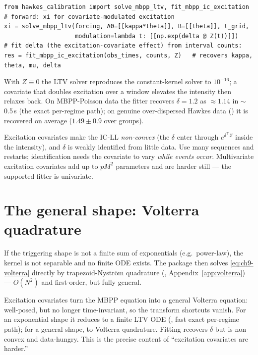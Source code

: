 \begin{lstlisting}[caption={Forward solve and fitting with excitation covariates.}]
from hawkes_calibration import solve_mbpp_ltv, fit_mbpp_ic_excitation
# forward: xi for covariate-modulated excitation
xi = solve_mbpp_ltv(forcing, A0=[[kappa*theta]], B=[[theta]], t_grid,
                    modulation=lambda t: [[np.exp(delta @ Z(t))]])
# fit delta (the excitation-covariate effect) from interval counts:
res = fit_mbpp_ic_excitation(obs_times, counts, Z)   # recovers kappa, theta, mu, delta
\end{lstlisting}

\begin{examplebox}
With $Z\equiv0$ the LTV solver reproduces the constant-kernel solver to $10^{-16}$;
a covariate that doubles excitation over a window elevates the intensity then
relaxes back. On MBPP-Poisson data the fitter recovers $\delta=1.2$ as $\approx1.14$
in $\sim$0.5\,s (the exact per-regime path); on genuine over-dispersed Hawkes data
() it is recovered on average ($1.49\pm0.9$ over groups).
\end{examplebox}

\begin{pitfall}
Excitation covariates make the IC-LL \emph{non-convex} (the $\delta$ enter through
$e^{\delta^\top Z}$ inside the intensity), and $\delta$ is weakly identified from
little data. Use many sequences and restarts; identification needs the covariate to
vary \emph{while events occur}. Multivariate excitation covariates add up to
$pM^2$ parameters and are harder still --- the supported fitter is univariate.
\end{pitfall}

\section{The general shape: Volterra quadrature}

If the triggering shape is not a finite sum of exponentials (e.g.\ power-law), the
kernel is not separable and no finite ODE exists. The package then solves
\eqref{eq:ch9-volterra} directly by trapezoid-Nyström quadrature
(, Appendix~\ref{app:volterra}) --- $O(N^2)$ and
first-order, but fully general.

\begin{recap}
Excitation covariates turn the MBPP equation into a general Volterra equation:
well-posed, but no longer time-invariant, so the transform shortcuts vanish. For an
exponential shape it reduces to a finite LTV ODE (, fast
exact per-regime path); for a general shape, to Volterra quadrature. Fitting
recovers $\delta$ but is non-convex and data-hungry. This is the precise content of
``excitation covariates are harder.''
\end{recap}

